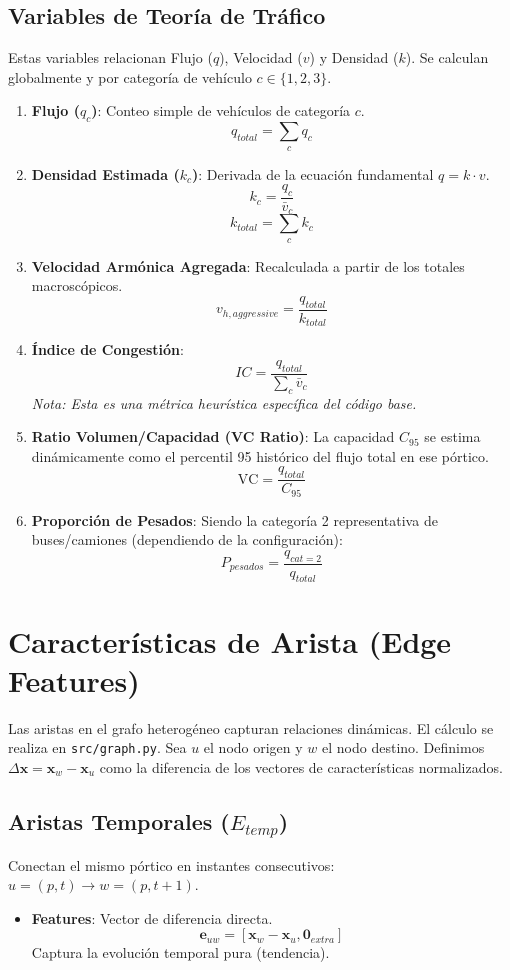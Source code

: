 \documentclass{article}
\begin{document}
\subsection{Variables de Teoría de Tráfico}
Estas variables relacionan Flujo ($q$), Velocidad ($v$) y Densidad ($k$). Se calculan globalmente y por categoría de vehículo $c \in \{1, 2, 3\}$.

\begin{enumerate}
    \item \textbf{Flujo ($q_c$)}: Conteo simple de vehículos de categoría $c$.
    \[ q_{total} = \sum_{c} q_c \]

    \item \textbf{Densidad Estimada ($k_c$)}:
    Derivada de la ecuación fundamental $q = k \cdot v$.
    \[ k_c = \frac{q_c}{\bar{v}_c} \]
    \[ k_{total} = \sum_{c} k_c \]

    \item \textbf{Velocidad Armónica Agregada}:
    Recalculada a partir de los totales macroscópicos.
    \[ v_{h, aggressive} = \frac{q_{total}}{k_{total}} \]

    \item \textbf{Índice de Congestión}:
    \[ IC = \frac{q_{total}}{\sum_c \bar{v}_c} \]
    \textit{Nota: Esta es una métrica heurística específica del código base.}

    \item \textbf{Ratio Volumen/Capacidad (VC Ratio)}:
    La capacidad $C_{95}$ se estima dinámicamente como el percentil 95 histórico del flujo total en ese pórtico.
    \[ \text{VC} = \frac{q_{total}}{C_{95}} \]

    \item \textbf{Proporción de Pesados}:
    Siendo la categoría 2 representativa de buses/camiones (dependiendo de la configuración):
    \[ P_{pesados} = \frac{q_{cat=2}}{q_{total}} \]
\end{enumerate}

\section{Características de Arista (Edge Features)}
Las aristas en el grafo heterogéneo capturan relaciones dinámicas. El cálculo se realiza en \texttt{src/graph.py}. Sea $u$ el nodo origen y $w$ el nodo destino. Definimos $\Delta \mathbf{x} = \mathbf{x}_w - \mathbf{x}_u$ como la diferencia de los vectores de características normalizados.

\subsection{Aristas Temporales ($E_{temp}$)}
Conectan el mismo pórtico en instantes consecutivos: $u=(p, t) \to w=(p, t+1)$.
\begin{itemize}
    \item \textbf{Features}: Vector de diferencia directa.
    \[ \mathbf{e}_{uw} = [\mathbf{x}_w - \mathbf{x}_u, \mathbf{0}_{extra}] \]
    Captura la evolución temporal pura (tendencia).
\end{itemize}
\end{document}
